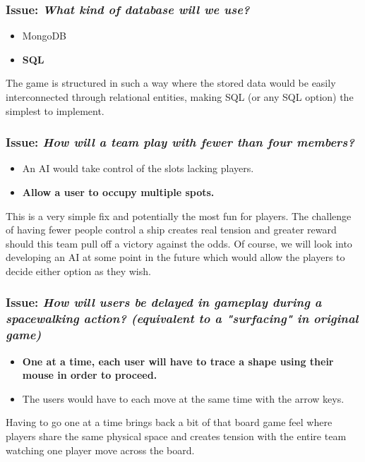\subsubsection*{Issue: \textit{What kind of database will we use?}}

  \begin{itemize}
    \item MongoDB
    \item \textbf{SQL}
  \end{itemize}

The game is structured in such a way where the stored data would be easily interconnected through relational entities, making SQL (or any SQL option) the simplest to implement.

\subsubsection*{Issue: \textit{How will a team play with fewer than four members?}}

  \begin{itemize}
    \item An AI would take control of the slots lacking players.
    \item \textbf{Allow a user to occupy multiple spots.}
  \end{itemize}

This is a very simple fix and potentially the most fun for players. The challenge of having fewer people control a ship creates real tension and greater reward should this team pull off a victory against the odds. Of course, we will look into developing an AI at some point in the future which would allow the players to decide either option as they wish.

\subsubsection*{Issue: \textit{How will users be delayed in gameplay during a spacewalking action? (equivalent to a "surfacing" in original game)}}

  \begin{itemize}
    \item \textbf{One at a time, each user will have to trace a shape using their mouse in order to proceed.}
    \item The users would have to each move at the same time with the arrow keys.
  \end{itemize}

Having to go one at a time brings back a bit of that board game feel where players share the same physical space and creates tension with the entire team watching one player move across the board.

